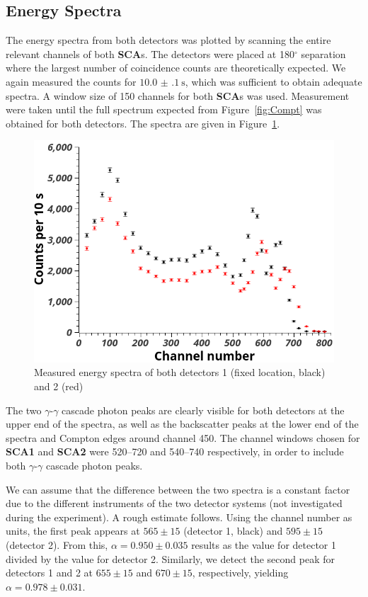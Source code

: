 \documentclass[twocolumn]{article}
\begin{document}
\subsection{Energy Spectra}
The energy spectra from both detectors was plotted by scanning the entire relevant channels of both \textbf{SCA}s. The detectors were placed at 180$^{\circ}$ separation where the largest number of coincidence counts are theoretically expected. We again measured the counts for $\SI[separate-uncertainty = true]{10.0(1) }{\second}$, which was sufficient to obtain adequate spectra. A window size of 150 channels for both \textbf{SCA}s was used. Measurement were taken until the full spectrum expected from Figure~\ref{fig:Compt} was obtained for both detectors. The spectra are given in Figure~\ref{fig:spectra}.
\begin{figure}[!h]
	\centering
	\includegraphics[width=0.9\linewidth]{detectors3.png}
	\caption{Measured energy spectra of both detectors 1 (fixed location, black) and 2 (red)}
	\label{fig:spectra}
\end{figure}
The two $\gamma$-$\gamma$ cascade photon peaks are clearly visible for both detectors at the upper end of the spectra, as well as the backscatter peaks at the lower end of the spectra and Compton edges around channel 450. The channel windows chosen for \textbf{SCA1} and \textbf{SCA2} were 520--720 and 540--740 respectively, in order to include both $\gamma$-$\gamma$ cascade photon peaks.
\par We can assume that the difference between the two spectra is a constant factor due to the different instruments of the two detector systems (not investigated during the experiment). A rough estimate follows. Using the channel number as units, the first peak appears at $565 \pm 15$ (detector 1, black) and $595 \pm 15$ (detector 2). From this, $\alpha = 0.950 \pm 0.035$ results as the value for detector 1 divided by the value for detector 2. Similarly, we detect the second peak for detectors 1 and 2 at $655 \pm 15$ and $670 \pm 15$, respectively, yielding $\alpha = 0.978 \pm 0.031$.
\end{document}
